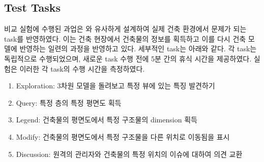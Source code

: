 

\subsection{Test Tasks}
비교 실험에 수행된 과업은 \cite{yeh_-site_2012}와 유사하게 설계하여 실제 건축 환경에서 문제가 되는 task를 반영하였다. 이는 건축 현장에서 건축물의 정보를 획득하고 이를 다시 건축 모델에 반영하는 일련의 과정을 반영하고 있다. 세부적인 task는 아래와 같다. 각 task는 독립적으로 수행되었으며, 새로운 task 수행 전에 5분 간의 휴식 시간을 제공하였다. 실험은 이러한 각 task의 수행 시간을 측정하였다. 
\begin{enumerate}
\item Exploration: 3차원 모델을 돌려보고 특정 뷰에 있는 특징 발견하기
\item Query: 특정 층의 특정 평면도 획득
\item Legend: 건축물의 평면도에서 특정 구조물의 dimension 획득
\item Modify: 건축물의 평면도에서 특정 구조물을 다른 위치로 이동됨을 표시
\item Discussion: 원격의 관리자와 건축물의 특정 위치의 이슈에 대하여 의견 교환
\end{enumerate}



